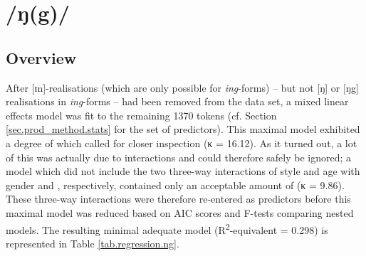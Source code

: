 \section{/ŋ(g)/}
\label{prod.res.con.ng}

\subsection{Overview}
\label{sec.prod.res.con.ng.overview}

After [ɪn]-realisations (which are only possible for \emph{ing}-forms) – but not [ŋ] or [ŋg] realisations in \emph{ing}-forms – had been removed from the data set, a mixed linear effects model was fit to the remaining 1370 tokens (cf. Section \ref{sec.prod_method.stats} for the set of predictors).
This maximal model exhibited a degree of  which called for closer inspection (κ = 16.12).
As it turned out, a lot of this  was actually due to interactions and could therefore safely be ignored; a model which did not include the two three-way interactions of style and age with gender and , respectively, contained only an acceptable amount of  (κ = 9.86).
These three-way interactions were therefore re-entered as predictors before this maximal model was reduced based on AIC scores and F-tests comparing nested models.
The resulting minimal adequate model (R\textsuperscript{2}-equivalent = 0.298) is represented in Table \ref{tab.regression.ng}.

